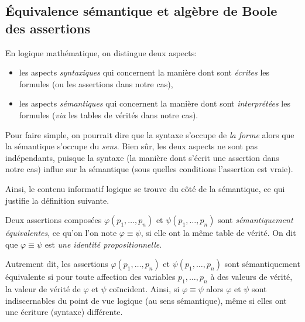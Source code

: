 \documentclass[french,course,oneside,theoremnosection]{lecture}
\begin{document}
\subsection{Équivalence sémantique et algèbre de Boole des assertions}

En logique mathématique, on distingue deux aspects:
\begin{itemize}
\item les aspects  \emph{syntaxiques} qui concernent la manière dont sont \emph{écrites} les formules (ou les assertions dans notre cas),
\item les aspects \emph{sémantiques} qui concernent la manière dont sont  \emph{interprétées} les formules (\emph{via} les tables de vérités dans notre cas).
\end{itemize}

Pour faire simple, on pourrait dire que la syntaxe s'occupe de \emph{la forme} alors que la sémantique s'occupe du \emph{sens}. Bien sûr, les deux aspects ne sont pas indépendants, puisque la syntaxe (la manière dont s'écrit une assertion dans notre cas) influe sur la sémantique (sous quelles conditions l'assertion est vraie). 

Ainsi, le contenu informatif logique se trouve du côté de la sémantique, ce qui justifie la définition suivante.

\begin{definition}
Deux assertions composées $\varphi(p_1, \ldots, p_n)$ et $\psi(p_1, \ldots, p_n)$ sont \emph{sémantiquement équivalentes}, ce qu'on l'on note $\varphi \equiv \psi$, si elle ont la même table de vérité. On dit que $\varphi \equiv \psi$ est \emph{une identité propositionnelle}.
\end{definition}

Autrement dit, les assertions $\varphi(p_1, \ldots, p_n)$ et $\psi(p_1, \ldots, p_n)$ sont sémantiquement équivalente si  pour toute affection des variables $p_1, \ldots, p_n$ à des valeurs de vérité, la valeur de vérité de $\varphi$ et $\psi$ coïncident. Ainsi, si $\varphi \equiv \psi$ alors $\varphi$ et $\psi$ sont indiscernables du point de vue logique (au sens sémantique), même si elles ont une écriture (syntaxe) différente. 
\end{document}
